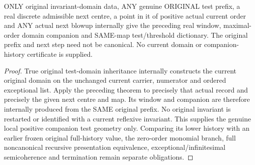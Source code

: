 \begin{theorem}
\label{hir:original-noncanonical-prefix-discrete-positive-companion-step}
\leanok
ONLY original invariant-domain data, ANY genuine ORIGINAL test prefix,
a real discrete admissible next centre, a point in it of positive actual
current order and ANY actual next blowup internally give the preceding
real window, maximal-order domain companion and SAME-map test/threshold
dictionary. The original prefix and next step need not be canonical.
No current domain or companion-history certificate is supplied.
\end{theorem}
\begin{proof}
True original test-domain inheritance internally constructs the current
original domain on the unchanged current carrier, numerator and ordered
exceptional list. Apply the preceding theorem to precisely that actual
record and precisely the given next centre and map. Its window and
companion are therefore internally produced from the SAME original
prefix. No original invariant is restarted or identified with a current
reflexive invariant. This supplies the genuine local positive companion
test geometry only. Comparing its lower history with an earlier frozen
original full-history value, the zero-order monomial branch, full
noncanonical recursive presentation equivalence, exceptional/infinitesimal
semicoherence and termination remain separate obligations.
\end{proof}


